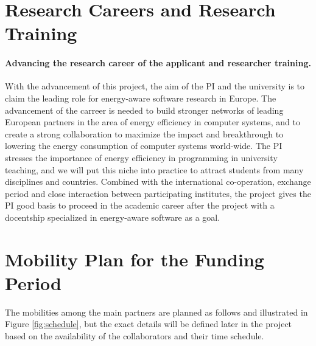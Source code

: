 \documentclass{article}
\begin{document}
\section{Research Careers and Research Training}
\label{sec:cooperation}
\paragraph{Advancing the research career of the applicant and researcher training.}
With the advancement of this project, the aim of the PI and the university is to claim the leading role for energy-aware software research in Europe.
The advancement of the carreer is needed to build stronger networks of leading European partners in the area of energy efficiency in computer systems,
and to create a strong collaboration to maximize the impact and breakthrough to lowering the energy consumption of computer systems world-wide.
The PI stresses the importance of energy efficiency in programming in university teaching, and we will put this niche into practice to attract students from many disciplines and countries.
Combined with the international co-operation, exchange period and close interaction between participating institutes, the project gives the PI good basis to proceed in the academic career after the project with a docentship specialized in energy-aware software as a goal.

\section{Mobility Plan for the Funding Period}
The mobilities among the main partners are planned as follows and illustrated in Figure \ref{fig:schedule}, but the exact details will be defined later in the project based on the availability of the collaborators and their time schedule.

\end{document}
